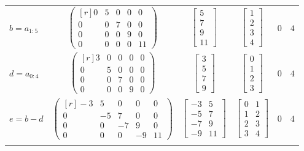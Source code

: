 \documentclass{article}
\begin{document}
\begin{table}
\begin{tabular}{@{}l c c c c c@{}}
  $b = a_{1:5}$ &
    $\begin{pmatrix*}[r]
      0 & 5 & 0 & 0 &  0 \\
      0 & 0 & 7 & 0 &  0 \\
      0 & 0 & 0 & 9 &  0 \\
      0 & 0 & 0 & 0 & 11
    \end{pmatrix*}$ &
    $\begin{bmatrix}5\\7\\9\\11\end{bmatrix}$ &
    $\begin{bmatrix}1\\2\\3\\4\end{bmatrix}$ &
    $0$ & $4$ \\ \addlinespace[8pt]

  $d = a_{0:4}$ &
    $\begin{pmatrix*}[r]
      3 & 0 & 0 & 0 & 0 \\
      0 & 5 & 0 & 0 & 0 \\
      0 & 0 & 7 & 0 & 0 \\
      0 & 0 & 0 & 9 & 0
    \end{pmatrix*}$ &
    $\begin{bmatrix}3\\5\\7\\9\end{bmatrix}$ &
    $\begin{bmatrix}0\\1\\2\\3\end{bmatrix}$ &
    $0$ & $4$ \\ \addlinespace[8pt]

  $e = b - d$ &
    $\begin{pmatrix*}[r]
      -3 & 5 & 0 & 0 &  0 \\
       0 & -5 & 7 & 0 &  0 \\
       0 & 0 & -7 & 9 &  0 \\
       0 & 0 & 0 & -9 & 11
    \end{pmatrix*}$ &
    $\begin{bmatrix}
      -3 & 5 \\
      -5 & 7 \\
      -7 & 9 \\
      -9 & 11
    \end{bmatrix}$ &
    $\begin{bmatrix}
      0 & 1 \\
      1 & 2 \\
      2 & 3 \\
      3 & 4
    \end{bmatrix}$ &
    $0$ & $4$ \\ \addlinespace[8pt]


\end{tabular}
\end{table}
\end{document}
